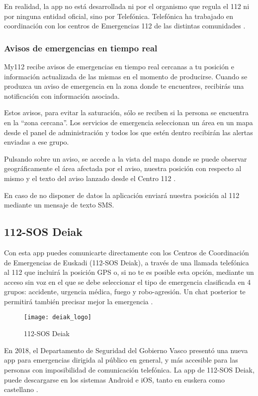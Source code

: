 En realidad, la app no está desarrollada ni por el organismo que regula el 112 ni por ninguna entidad oficial, sino por Telefónica. Telefónica ha trabajado en coordinación con los centros de Emergencias 112 de las distintas comunidades \cite{myapp5}.

\subsubsection{Avisos de emergencias en tiempo real}

My112 recibe avisos de emergencias en tiempo real cercanas a tu posición e información actualizada de las mismas en el momento de producirse. Cuando se produzca un aviso de emergencia en la zona donde te encuentres, recibirás una notificación con información asociada.

Estos avisos, para evitar la saturación, sólo se reciben si la persona se encuentra en la “zona cercana”. Los servicios de emergencia seleccionan un área en un mapa desde el panel de administración y todos los que estén dentro recibirán las alertas enviadas a ese grupo.

Pulsando sobre un aviso, se accede a la vista del mapa donde se puede observar geográficamente el área afectada por el aviso, nuestra posición con respecto al mismo y el texto del aviso lanzado desde el Centro 112 \cite{myapp4}.

En caso de no disponer de datos la aplicación enviará nuestra posición al 112 mediante un mensaje de texto SMS.

\subsection{112-SOS Deiak}

Con esta app puedes comunicarte directamente con los Centros de Coordinación de Emergencias de Euskadi (112-SOS Deiak), a través de una llamada telefónica al 112 que incluirá la posición GPS o, si no te es posible esta opción, mediante un acceso sin voz en el que se debe seleccionar el tipo de emergencia clasificada en 4 grupos: accidente, urgencia médica, fuego y robo-agresión. Un chat posterior te permitirá también precisar mejor la emergencia \cite{deiak1}.

\begin{figure}[htp!]
  \centering
  \texttt{[image: deiak\_logo]}
  \caption{112-SOS Deiak}
  \label{fig:deiak_logo}
\end{figure}

En 2018, el Departamento de Seguridad del Gobierno Vasco presentó una nueva app para emergencias dirigida al público en general, y más accesible para las personas con imposibilidad de comunicación telefónica. La app de 112-SOS Deiak, puede descargarse en los sistemas Android e iOS, tanto en euskera como castellano \cite{deiak3}.

